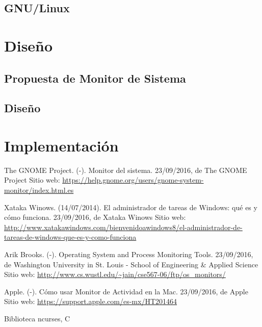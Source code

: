 \documentclass[a4paper,11pt]{article}
\begin{document}
\subsection{GNU/Linux}

\section{Diseño}

\subsection{Propuesta de Monitor de Sistema}

\subsection{Diseño}

\section{Implementación}

\begin{thebibliography}{}

  The GNOME Project.
  (-).
  Monitor del sistema.
  23/09/2016, 
  de The GNOME Project 
  Sitio web:   \url{https://help.gnome.org/users/gnome-system-monitor/index.html.es}

  Xataka Winows. 
  (14/07/2014). 
  El administrador de tareas de Windows: qué es y cómo funciona. 
  23/09/2016, de Xataka Winows 
  Sitio web: \url{http://www.xatakawindows.com/bienvenidoawindows8/el-administrador-de-tareas-de-windows-que-es-y-como-funciona}

  Arik Brooks. 
  (-). 
  Operating System and Process Monitoring Tools. 
  23/09/2016, de Washington University in St. Louis - School of Engineering \& Applied Science 
  Sitio web: \url{http://www.cs.wustl.edu/~jain/cse567-06/ftp/os_monitors/}

  Apple. 
  (-). 
  Cómo usar Monitor de Actividad en la Mac. 
  23/09/2016, de Apple 
  Sitio web: \url{https://support.apple.com/es-mx/HT201464}

\end{thebibliography}

Biblioteca ncurses, C
\end{document}
